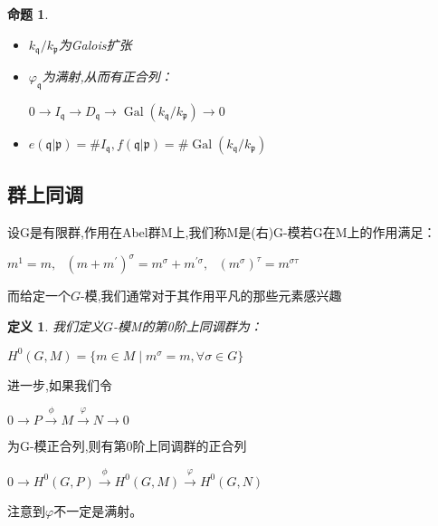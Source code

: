 \documentclass[11pt]{ctexart}
\DeclareMathOperator{\Gal}{Gal}
\newtheorem{defi}{定义}[section]
\newtheorem{pro}{命题}[section]
\begin{document}
\begin{pro}~

    \begin{itemize}
        \item $k_{\mathfrak{q}}/k_{\mathfrak{p}}$为Galois扩张
        \item $\varphi_{\mathfrak{q}}$为满射,从而有正合列：
        \begin{center}
            $0\rightarrow I_{\mathfrak{q}} \rightarrow D_{\mathfrak{q}}\rightarrow \Gal(k_{\mathfrak{q}}/k_{\mathfrak{p}}) \rightarrow 0$ 
        \end{center}
        \item $e(\mathfrak{q}|\mathfrak{p})= \# I_{\mathfrak{q}}$$,f(\mathfrak{q}|\mathfrak{p})= \#\Gal(k_{\mathfrak{q}}/k_{\mathfrak{p}}) $
    \end{itemize}

\end{pro}
\subsection{群上同调}

设G是有限群,作用在Abel群M上,我们称M是(右)G-模若G在M上的作用满足：
\begin{center}
    $m^1=m,~~~(m+m^{\prime})^{\sigma}=m^{\sigma}+m^{\prime\sigma},~~~(m^{\sigma})^{\tau}=m^{\sigma\tau}$
\end{center}
\noindent 而给定一个$G$-模,我们通常对于其作用平凡的那些元素感兴趣

\begin{defi}
    我们定义$G$-模M的第0阶上同调群为：
    \begin{center}
        $H^0(G,M)=\{m\in M\mid m^{\sigma}=m,\forall \sigma \in G\}$
    \end{center}
\end{defi}
\noindent 进一步,如果我们令
\begin{center}
    $0 \rightarrow P\stackrel{\phi} {\rightarrow} M \stackrel{\varphi} {\rightarrow}  N \rightarrow 0$
\end{center}
为G-模正合列,则有第0阶上同调群的正合列
\begin{center}
    $0 \rightarrow H^0(G,P)\stackrel{\phi} {\rightarrow} H^0(G,M) \stackrel{\varphi} {\rightarrow} H^0(G,N)$
\end{center}
\noindent 注意到$\varphi$不一定是满射。
\end{document}
